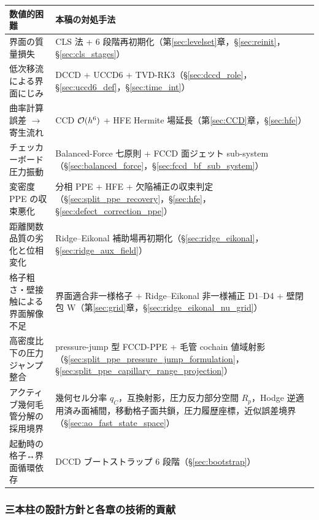 \begin{center}
\renewcommand{\arraystretch}{\PaperTableArrayStretch}
\begin{tabular}{>{\raggedright}p{58mm}>{\raggedright\arraybackslash}p{82mm}}
\hline
\textbf{数値的困難} & \textbf{本稿の対処手法} \\
\hline
界面の質量損失       & CLS 法 + 6 段階再初期化（第\ref{sec:levelset}章，§\ref{sec:reinit}，§\ref{sec:cls_stages}）\\
低次移流による界面にじみ & DCCD + UCCD6 + TVD-RK3（§\ref{sec:dccd_role}，§\ref{sec:uccd6_def}，§\ref{sec:time_int}）\\
曲率計算誤差 $\to$ 寄生流れ & CCD $\mathcal{O}(h^6)$ + HFE Hermite 場延長（第\ref{sec:CCD}章，§\ref{sec:hfe}）\\
チェッカーボード圧力振動 & Balanced-Force 七原則 + FCCD 面ジェット sub-system（§\ref{sec:balanced_force}，§\ref{sec:fccd_bf_sub_system}）\\
変密度 PPE の収束悪化 & 分相 PPE + HFE + 欠陥補正の収束判定（§\ref{sec:split_ppe_recovery}，§\ref{sec:hfe}，§\ref{sec:defect_correction_ppe}）\\
距離関数品質の劣化と位相変化 & Ridge--Eikonal 補助場再初期化（§\ref{sec:ridge_eikonal}，§\ref{sec:ridge_aux_field}）\\
格子粗さ・壁接触による界面解像不足 & 界面適合非一様格子 + Ridge--Eikonal 非一様補正 D1--D4 + 壁閉包 W（第\ref{sec:grid}章，§\ref{sec:ridge_eikonal_nu_grid}）\\
高密度比下の圧力ジャンプ整合 & pressure-jump 型 FCCD-PPE + 毛管 cochain 値域射影（§\ref{sec:split_ppe_pressure_jump_formulation}，§\ref{sec:split_ppe_capillary_range_projection}）\\
アクティブ幾何毛管分解の採用境界 & 幾何セル分率 $q_C$，互換射影，圧力反力部分空間 $R_p$，Hodge 逆適用済み面補間，移動格子面共鎖，圧力履歴座標，近似誤差境界（§\ref{sec:ao_fast_state_space}）\\
起動時の格子↔界面循環依存 & DCCD ブートストラップ 6 段階（§\ref{sec:bootstrap}）\\
\hline
\end{tabular}
\end{center}

\subsubsection{三本柱の設計方針と各章の技術的貢献}

